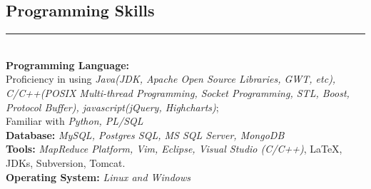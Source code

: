 \documentclass{res}
\begin{document}
\begin{resume}
\section{\bfseries\Large Programming Skills}
\hspace{-0.5in}\rule{16.8cm}{0.4pt}\\
    \textbf{Programming Language:}\\ 
		Proficiency in using \textit{Java(JDK, Apache Open Source Libraries, GWT, etc), C/C++(POSIX Multi-thread Programming, Socket Programming, STL, Boost, Protocol Buffer),
		javascript(jQuery, Highcharts)};\\ 
		Familiar with \textit{Python, PL/SQL} \\
    \textbf{Database:} \textit{MySQL, Postgres SQL, MS SQL Server, MongoDB}   \\
    \textbf{Tools:} \textit{MapReduce Platform, Vim, Eclipse, Visual Studio (C/C++)}, \LaTeX, JDKs, Subversion, Tomcat.  \\
    \textbf{Operating System:} \textit{Linux and Windows}  \\
\end{resume}
\end{document}

